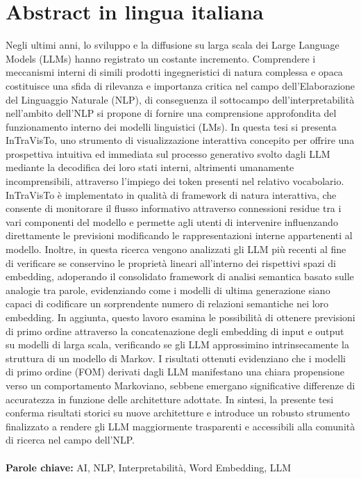 \documentclass{Configuration_Files/PoliMi3i_thesis}
\begin{document}
\chapter*{Abstract in lingua italiana}
Negli ultimi anni, lo sviluppo e la diffusione su larga scala dei Large Language Models (LLMs) hanno registrato un costante incremento.
Comprendere i meccanismi interni di simili prodotti ingegneristici di natura complessa e opaca costituisce una sfida di rilevanza e importanza critica nel campo dell'Elaborazione del Linguaggio Naturale (NLP), di conseguenza il sottocampo dell'interpretabilità nell'ambito dell'NLP si propone di fornire una comprensione approfondita del funzionamento interno dei modelli linguistici (LMs).
In questa tesi si presenta InTraVisTo, uno strumento di visualizzazione interattiva concepito per offrire una prospettiva intuitiva ed immediata sul processo generativo svolto dagli LLM mediante la decodifica dei loro stati interni, altrimenti umanamente incomprensibili, attraverso l'impiego dei token presenti nel relativo vocabolario.
InTraVisTo è implementato in qualità di framework di natura interattiva, che consente di monitorare il flusso informativo attraverso connessioni residue tra i vari componenti del modello e permette agli utenti di intervenire influenzando direttamente le previsioni modificando le rappresentazioni interne appartenenti al modello.
Inoltre, in questa ricerca vengono analizzati gli LLM più recenti al fine di verificare se conservino le proprietà lineari all'interno dei rispettivi spazi di embedding, adoperando il consolidato framework di analisi semantica basato sulle analogie tra parole, evidenziando come i modelli di ultima generazione siano capaci di codificare un sorprendente numero di relazioni semantiche nei loro embedding.
In aggiunta, questo lavoro esamina le possibilità di ottenere previsioni di primo ordine attraverso la concatenazione degli embedding di input e output su modelli di larga scala, verificando se gli LLM approssimino intrinsecamente la struttura di un modello di Markov.
I risultati ottenuti evidenziano che i modelli di primo ordine (FOM) derivati dagli LLM manifestano una chiara propensione verso un comportamento Markoviano, sebbene emergano significative differenze di accuratezza in funzione delle architetture adottate.
In sintesi, la presente tesi conferma risultati storici su nuove architetture e introduce un robusto strumento finalizzato a rendere gli LLM maggiormente trasparenti e accessibili alla comunità di ricerca nel campo dell'NLP\@.
\\
\\
\textbf{Parole chiave:} AI, NLP, Interpretabilità, Word Embedding, LLM
\end{document}
